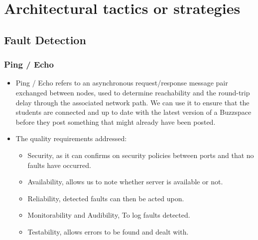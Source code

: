 \documentclass[12pt, oneside]{article}
\begin{document}
\section{Architectural tactics or strategies}
	\subsection{Fault Detection}
		\subsubsection{Ping / Echo}			
			\begin{itemize}		
				\item Ping / Echo refers to an asynchronous request/response message pair exchanged between nodes, used to determine reachability and the round-trip delay through the associated network path. We can use it to ensure that the students are connected and up to date with the latest version of a Buzzspace before they post something that might already have been posted.
				\item The quality requirements addressed:
					\begin{itemize}
						\item Security, as it can confirms on security policies between ports and that no faults have occurred.
						\item Availability, allows us to note whether server is available or not.
						\item Reliability, detected faults can then be acted upon. 
						\item Monitorability and Audibility, To log faults detected.
						\item Testability, allows errors to be found and dealt with.
					\end{itemize}
			\end{itemize}
			
\end{document}
